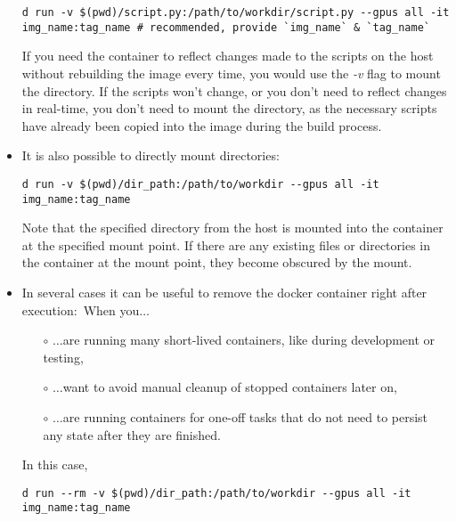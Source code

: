 \documentclass[12pt, a4paper]{scrbook}
\numberwithin{equation}{section}
\theoremstyle{definition}
\theoremstyle{definition}
\begin{document}
\begin{itemize}
		\begin{lstlisting}[style=mystylebash, label=alg:docker_run__with_pwd, xleftmargin=\parindent]
			d run -v $(pwd)/script.py:/path/to/workdir/script.py --gpus all -it img_name:tag_name # recommended, provide `img_name` & `tag_name`
		\end{lstlisting}
		
		If you need the container to reflect changes made to the scripts on the host without rebuilding the image every time, you would use the \textit{-v} flag to mount the directory. If the scripts won't change, or you don't need to reflect changes in real-time, you don't need to mount the directory, as the necessary scripts have already been copied into the image during the build process.
		
		\item It is also possible to directly mount directories:
		
		\begin{lstlisting}[style=mystylebash, label=alg:docker_run__mount_dir, xleftmargin=\parindent]
			d run -v $(pwd)/dir_path:/path/to/workdir --gpus all -it img_name:tag_name
		\end{lstlisting}
		
		Note that the specified directory from the host is mounted into the container at the specified mount point. If there are any existing files or directories in the container at the mount point, they become obscured by the mount.
		
		\item In several cases it can be useful to remove the docker container right after execution:~When you$\dots$
		\begin{itemize}
			\item[$\circ$] $\dots$are running many short-lived containers, like during development or testing,
			\item[$\circ$] $\dots$want to avoid manual cleanup of stopped containers later on,
			\item[$\circ$] $\dots$are running containers for one-off tasks that do not need to persist any state after they are finished.
		\end{itemize}
		
		In this case, 
		
		\begin{lstlisting}[style=mystylebash, label=alg:docker_run__mount_dir_rm, xleftmargin=\parindent]
			d run --rm -v $(pwd)/dir_path:/path/to/workdir --gpus all -it img_name:tag_name
		\end{lstlisting}
		

\end{itemize}
\end{document}
